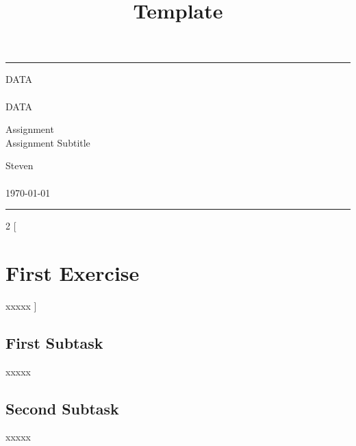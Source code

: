 \documentclass[a4paper, 11pt]{article} %
\begin{document}

\title{Template} %
\fancyhead[C]{}
\hrule \medskip %
\begin{minipage}{0.295\textwidth} %
    \raggedright
    DATA\\ %
    \footnotesize %
    \hfill\\
    DATA\\ %
\end{minipage}
\begin{minipage}{0.4\textwidth} %
    \centering
    \large %
    Assignment\\ %
    \normalsize %
    Assignment Subtitle\\ %
\end{minipage}
\begin{minipage}{0.295\textwidth} %
    \raggedleft
    Steven\\ %
    \footnotesize %
    \hfill\\
    \today\\ %
\end{minipage}
\medskip\hrule %
\bigskip

\begin{multicols}{2}
    [
        \section{First Exercise}
        xxxxx
    ]

    \subsection{First Subtask}
    xxxxx

    \subsection{Second Subtask}
    xxxxx


\end{multicols}
\end{document}
